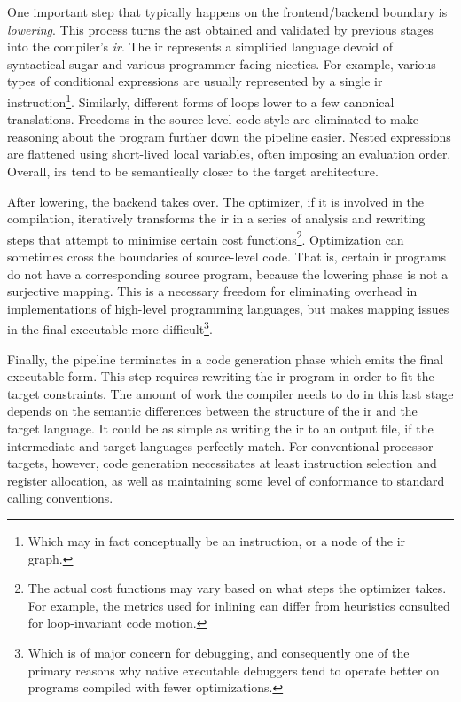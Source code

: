 One important step that typically happens on the frontend/backend boundary is
\emph{lowering}. This process turns the \acrshort{ast} obtained and validated by
previous stages into the compiler's \emph{\acrfull{ir}}. The \acrshort{ir}
represents a simplified language devoid of syntactical sugar and various
programmer-facing niceties. For example, various types of conditional
expressions are usually represented by a single \acrshort{ir}
instruction\footnote{Which may in fact conceptually be an instruction, or a node
of the \acrshort{ir} graph.}. Similarly, different forms of loops lower to a few
canonical translations. Freedoms in the source-level code style are eliminated
to make reasoning about the program further down the pipeline easier. Nested
expressions are flattened using short-lived local variables, often imposing an
evaluation order. Overall, \acrlong{ir}s tend to be semantically closer to the
target architecture.

After lowering, the backend takes over. The optimizer, if it is involved in the
compilation, iteratively transforms the \acrshort{ir} in a series of analysis
and rewriting steps that attempt to minimise certain cost functions\footnote{The
actual cost functions may vary based on what steps the optimizer takes. For
example, the metrics used for inlining can differ from heuristics consulted for
loop-invariant code motion.}. Optimization can sometimes cross the boundaries of
source-level code. That is, certain \acrshort{ir} programs do not have a
corresponding source program, because the lowering phase is not a surjective
mapping. This is a necessary freedom for eliminating overhead in implementations
of high-level programming languages, but makes mapping issues in the final
executable more difficult\footnote{Which is of major concern for debugging, and
consequently one of the primary reasons why native executable debuggers tend to
operate better on programs compiled with fewer optimizations.}.

Finally, the pipeline terminates in a code generation phase which emits the
final executable form. This step requires rewriting the \acrshort{ir} program in
order to fit the target constraints. The amount of work the compiler needs to do
in this last stage depends on the semantic differences between the structure of
the \acrlong{ir} and the target language. It could be as simple as writing the
\acrshort{ir} to an output file, if the intermediate and target languages
perfectly match. For conventional processor targets, however, code generation
necessitates at least instruction selection and register allocation, as well as
maintaining some level of conformance to standard calling conventions.

